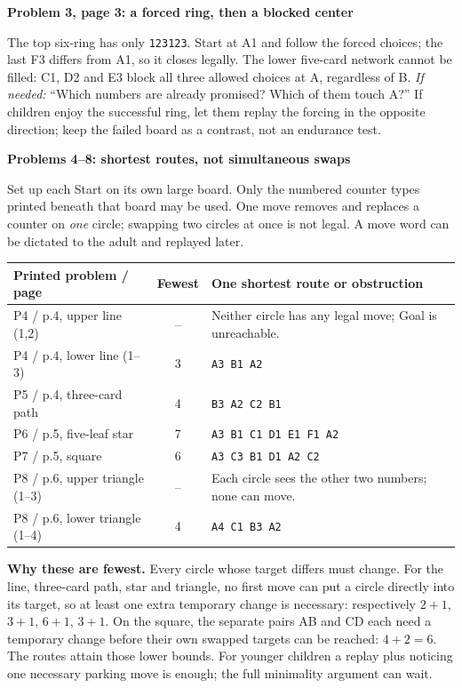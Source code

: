 \documentclass[10pt]{article}
\newcommand{\sub}[1]{\par\textbf{#1}\par}
\newcommand{\hint}[1]{\textit{If needed:} #1}
\newcommand{\word}[1]{\texttt{#1}}
\begin{document}
\sub{Problem 3, page 3: a forced ring, then a blocked center}
The top six-ring has only \word{123123}. Start at A1 and follow the forced choices; the last F3 differs from A1, so it closes legally. The lower five-card network cannot be filled: C1, D2 and E3 block all three allowed choices at A, regardless of B. \hint{``Which numbers are already promised? Which of them touch A?''} If children enjoy the successful ring, let them replay the forcing in the opposite direction; keep the failed board as a contrast, not an endurance test.

\sub{Problems 4--8: shortest routes, not simultaneous swaps}
Set up each Start on its own large board. Only the numbered counter types printed beneath that board may be used. One move removes and replaces a counter on \emph{one} circle; swapping two circles at once is not legal. A move word can be dictated to the adult and replayed later.
\begin{center}\renewcommand{\arraystretch}{1.25}
\begin{tabular}{p{.25\linewidth}c p{.57\linewidth}}
Printed problem / page & Fewest & One shortest route or obstruction\\\midrule
P4 / p.4, upper line (1,2) & -- & Neither circle has any legal move; Goal is unreachable.\\
P4 / p.4, lower line (1--3) & 3 & \word{A3 B1 A2}\\
P5 / p.4, three-card path & 4 & \word{B3 A2 C2 B1}\\
P6 / p.5, five-leaf star & 7 & \word{A3 B1 C1 D1 E1 F1 A2}\\
P7 / p.5, square & 6 & \word{A3 C3 B1 D1 A2 C2}\\
P8 / p.6, upper triangle (1--3) & -- & Each circle sees the other two numbers; none can move.\\
P8 / p.6, lower triangle (1--4) & 4 & \word{A4 C1 B3 A2}\\
\end{tabular}\end{center}
\textbf{Why these are fewest.} Every circle whose target differs must change. For the line, three-card path, star and triangle, no first move can put a circle directly into its target, so at least one extra temporary change is necessary: respectively $2+1$, $3+1$, $6+1$, $3+1$. On the square, the separate pairs AB and CD each need a temporary change before their own swapped targets can be reached: $4+2=6$. The routes attain those lower bounds. For younger children a replay plus noticing one necessary parking move is enough; the full minimality argument can wait.
\end{document}
